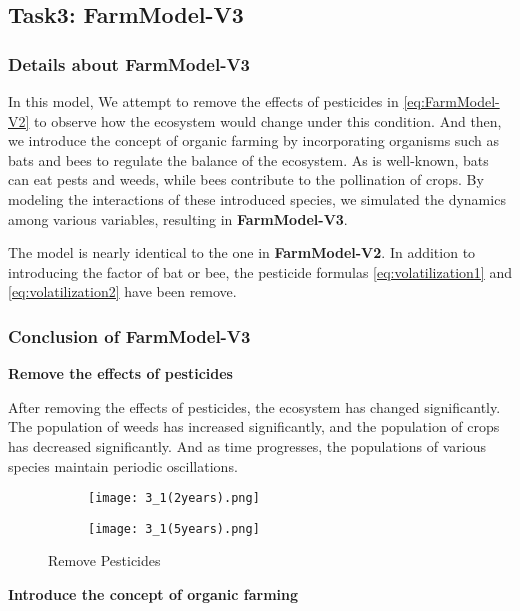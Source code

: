 \documentclass[12pt]{article}  %
\begin{document}
\subsection{Task3: FarmModel-V3}
\subsubsection{Details about FarmModel-V3}
In this model, We 
attempt to remove the effects of pesticides in \ref{eq:FarmModel-V2} to
observe how the ecosystem would change under this condition. And then,
we introduce the concept of organic farming by incorporating organisms
such as bats and bees to regulate the balance of the ecosystem. 
As is well-known, bats can eat pests and weeds, while bees 
contribute to the pollination of crops.
By modeling
the interactions of these introduced species, we simulated the dynamics
among various variables, resulting in \textbf{FarmModel-V3}.

The model is nearly identical to the one in \textbf{FarmModel-V2}. 
In addition to introducing the factor of bat or bee, the pesticide formulas
 \eqref{eq:volatilization1} and \eqref{eq:volatilization2} have been remove.

\subsubsection{Conclusion of FarmModel-V3}
\noindent\textbf{Remove the effects of pesticides}

After removing the effects of pesticides, the ecosystem has changed 
significantly. The population of weeds has increased significantly,
and the population of crops has decreased significantly. And as
time progresses, the populations of various species maintain periodic oscillations.

\begin{figure}[h]
    \centering
    \begin{subfigure}[b]{.4\textwidth}
        \texttt{[image: 3\_1(2years).png]}
        \label{subfigure:3-1(2years)}
    \end{subfigure}
    \begin{subfigure}[b]{.4\textwidth}
        \texttt{[image: 3\_1(5years).png]}
        \label{subfig:3-1(5years)}
    \end{subfigure}
    \caption{Remove Pesticides}\label{fig:FarmModel-V3.1}
    \end{figure}

\noindent\textbf{Introduce the concept of organic farming}
\end{document}
